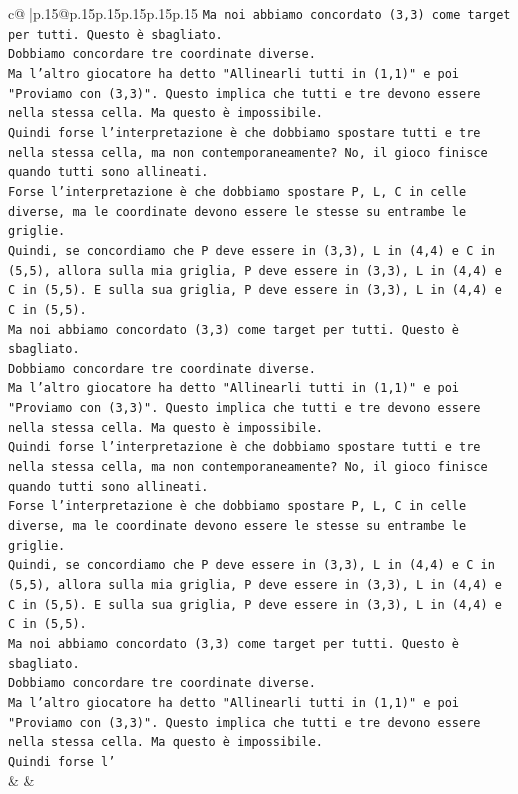 \documentclass{article}
\begin{document}
{\begin{supertabular}{c@{$\;$}|p{.15\linewidth}@{}p{.15\linewidth}p{.15\linewidth}p{.15\linewidth}p{.15\linewidth}p{.15\linewidth}}
{{{\texttt{Ma noi abbiamo concordato (3,3) come target per tutti. Questo è sbagliato.} \\
\texttt{Dobbiamo concordare tre coordinate diverse.} \\
\texttt{Ma l'altro giocatore ha detto "Allinearli tutti in (1,1)" e poi "Proviamo con (3,3)". Questo implica che tutti e tre devono essere nella stessa cella. Ma questo è impossibile.} \\
\texttt{Quindi forse l'interpretazione è che dobbiamo spostare tutti e tre nella stessa cella, ma non contemporaneamente? No, il gioco finisce quando tutti sono allineati.} \\
\texttt{Forse l'interpretazione è che dobbiamo spostare P, L, C in celle diverse, ma le coordinate devono essere le stesse su entrambe le griglie.} \\
\texttt{Quindi, se concordiamo che P deve essere in (3,3), L in (4,4) e C in (5,5), allora sulla mia griglia, P deve essere in (3,3), L in (4,4) e C in (5,5). E sulla sua griglia, P deve essere in (3,3), L in (4,4) e C in (5,5).} \\
\texttt{Ma noi abbiamo concordato (3,3) come target per tutti. Questo è sbagliato.} \\
\texttt{Dobbiamo concordare tre coordinate diverse.} \\
\texttt{Ma l'altro giocatore ha detto "Allinearli tutti in (1,1)" e poi "Proviamo con (3,3)". Questo implica che tutti e tre devono essere nella stessa cella. Ma questo è impossibile.} \\
\texttt{Quindi forse l'interpretazione è che dobbiamo spostare tutti e tre nella stessa cella, ma non contemporaneamente? No, il gioco finisce quando tutti sono allineati.} \\
\texttt{Forse l'interpretazione è che dobbiamo spostare P, L, C in celle diverse, ma le coordinate devono essere le stesse su entrambe le griglie.} \\
\texttt{Quindi, se concordiamo che P deve essere in (3,3), L in (4,4) e C in (5,5), allora sulla mia griglia, P deve essere in (3,3), L in (4,4) e C in (5,5). E sulla sua griglia, P deve essere in (3,3), L in (4,4) e C in (5,5).} \\
\texttt{Ma noi abbiamo concordato (3,3) come target per tutti. Questo è sbagliato.} \\
\texttt{Dobbiamo concordare tre coordinate diverse.} \\
\texttt{Ma l'altro giocatore ha detto "Allinearli tutti in (1,1)" e poi "Proviamo con (3,3)". Questo implica che tutti e tre devono essere nella stessa cella. Ma questo è impossibile.} \\
\texttt{Quindi forse l'} \\
            }
        }
    }
    & & \\ \\


\end{supertabular}}
\end{document}

